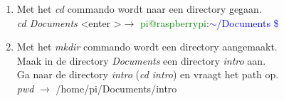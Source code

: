 \begin{enumerate}
\begin{enumerate}
\begin{enumerate}
	\item  Met het \textit{cd} commando wordt naar een directory gegaan.\\  
	\textit{cd Documents} \textless enter \textgreater $\rightarrow$  
	\textcolor{green}{pi@raspberrypi}:\textcolor{blue}{$\mathtt{\sim}$/Documents \$}
	\item  Met het \textit{mkdir} commando wordt een directory aangemaakt.\\
	Maak in de directory \textit{Documents} een directory \textit{intro} aan. \\
	Ga naar de directory \textit{intro} (\textit{cd intro}) en vraagt het path op.\\
	\textit{pwd}  $\rightarrow$  /home/pi/Documents/intro
	
\end{enumerate}


\end{enumerate}
\end{enumerate}
